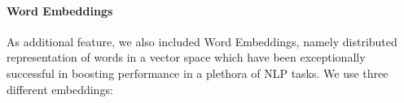 \documentclass[11pt]{article}
\begin{document}
%
%
%
%
%

\paragraph{Word Embeddings}
As additional feature, we also included Word Embeddings, namely distributed representation of words in a vector space which have been exceptionally successful in boosting performance in a plethora of NLP tasks.%
We use three different embeddings: 
\end{document}

